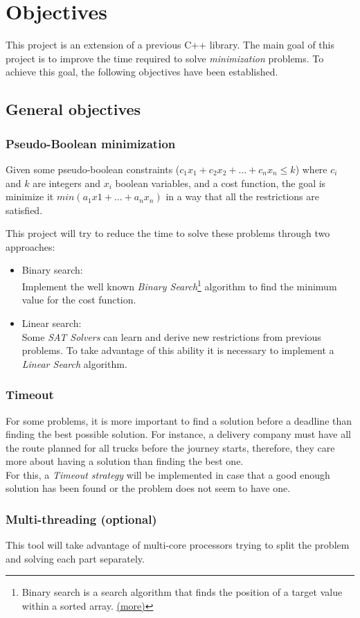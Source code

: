 
\chapter{Objectives} %

\label{Chapter1} %

This project is an extension of a previous C++ library. The main goal of this project is to improve the time required to solve \emph{minimization} problems. To achieve this goal, the following objectives have been established. 

\section{General objectives}

\subsection{Pseudo-Boolean minimization}
Given some pseudo-boolean constraints ($c_{1}x_{1}+c_{2}x_{2}+\ldots +c_{n}x_{n} \leq k$) where $c_{i}$ and $k$ are integers and $x_{i}$ boolean variables, and a cost function, the goal is minimize it  $min(a_{1}x{1} + ... + a_{n}x_{n})$ in a way that all the restrictions are satisfied.


This project will try to reduce the time to solve these problems through two approaches:
\begin{itemize}
	\item Binary search:\\
	Implement the well known \emph{Binary Search}\footnote{Binary search is a search algorithm that finds the position of a target value within a sorted array. \href{https://en.wikipedia.org/wiki/Binary_search_algorithm}{(more)}} algorithm to find the minimum value for the cost function.
	\item Linear search:\\
	Some \emph{SAT Solvers} can learn and derive new restrictions from previous problems. To take advantage of this ability it is necessary to implement a \emph{Linear Search} algorithm.
\end{itemize}

\subsection{Timeout} 
For some problems, it is more important to find a solution before a deadline than finding the best possible solution. For instance, a delivery company must have all the route planned for all trucks before the journey starts, therefore, they care more about having a solution than finding the best one.\\
For this, a \emph{Timeout strategy} will be implemented in case that a good enough solution has been found or the problem does not seem to have one. 
\subsection{Multi-threading (optional)}
This tool will take advantage of multi-core processors trying to split the problem and solving each part separately.
